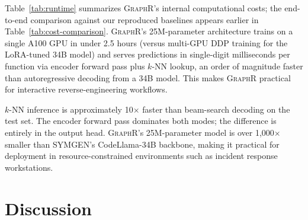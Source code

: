 \documentclass[sigconf,nonacm]{acmart}
\newcommand{\sysname}{\textsc{GraphR}}
\begin{document}
Table~\ref{tab:runtime} summarizes \sysname{}'s internal computational costs; the end-to-end comparison against our reproduced baselines appears earlier in Table~\ref{tab:cost-comparison}. \sysname{}'s 25M-parameter architecture trains on a single A100 GPU in under 2.5 hours (versus multi-GPU DDP training for the LoRA-tuned 34B model) and serves predictions in single-digit milliseconds per function via encoder forward pass plus $k$-NN lookup, an order of magnitude faster than autoregressive decoding from a 34B model. This makes \sysname{} practical for interactive reverse-engineering workflows.

\begin{table}[t]
    \centering
    \caption{Runtime analysis on NVIDIA A100 (\textbf{80GB}).}
    \label{tab:runtime}
    \footnotesize
\end{table}

$k$-NN inference is approximately 10$\times$ faster than beam-search decoding on the test set. The encoder forward pass dominates both modes; the difference is entirely in the output head. \sysname{}'s 25M-parameter model is over 1{,}000$\times$ smaller than SYMGEN's CodeLlama-34B backbone, making it practical for deployment in resource-constrained environments such as incident response workstations.

\section{Discussion}
\label{sec:discussion}
\end{document}
